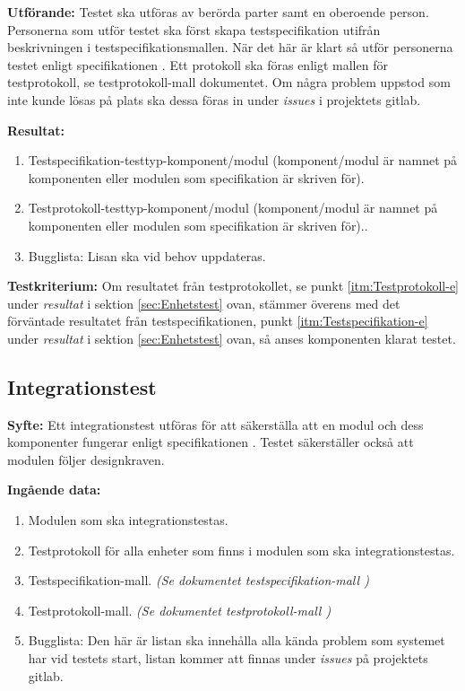 \documentclass[a4paper,10pt]{article}
\begin{document}
    \textbf{Utförande:} Testet ska utföras av berörda parter samt en oberoende person. Personerna som utför testet ska först skapa testspecifikation utifrån beskrivningen i testspecifikationsmallen. När det här är klart så utför personerna testet enligt specifikationen \cite{kravspec}. Ett protokoll ska föras enligt mallen för testprotokoll, se testprotokoll-mall dokumentet. Om några problem uppstod som inte kunde lösas på plats ska dessa föras in under \emph{issues} i projektets gitlab.

    \textbf{Resultat:}
        \begin{enumerate}
            \item \label{itm:Testspecifikation-e} Testspecifikation-testtyp-komponent/modul (komponent/modul är namnet på komponenten eller modulen som specifikation är skriven för).
            \item \label{itm:Testprotokoll-e} Testprotokoll-testtyp-komponent/modul (komponent/modul är namnet på komponenten eller modulen som specifikation är skriven för)..
            \item Bugglista: Lisan ska vid behov uppdateras.
        \end{enumerate}
    \textbf{Testkriterium:} Om resultatet från testprotokollet, se punkt \ref{itm:Testprotokoll-e} under \emph{resultat} i sektion \ref{sec:Enhetstest} ovan, stämmer överens med det förväntade resultatet från testspecifikationen, punkt \ref{itm:Testspecifikation-e} under \emph{resultat} i sektion \ref{sec:Enhetstest} ovan, så anses komponenten klarat testet.

\subsection{Integrationstest}
\label{sec:Integrationstest}
\textbf{Syfte:}
Ett integrationstest utföras för att säkerställa att en modul och dess komponenter fungerar enligt specifikationen \cite{kravspec}. Testet säkerställer också att modulen följer designkraven.

\textbf{Ingående data:}
    \begin{enumerate}
        \item Modulen som ska integrationstestas.
        \item Testprotokoll för alla enheter som finns i modulen som ska integrationstestas.
        \item Testspecifikation-mall. \emph{(Se dokumentet testspecifikation-mall \cite{testspec-mall})}
        \item Testprotokoll-mall. \emph{(Se dokumentet testprotokoll-mall \cite{testprot-mall})}
        \item Bugglista: Den här är listan ska innehålla alla kända problem som systemet har vid testets start, listan kommer att finnas under \emph{issues} på projektets gitlab.
    \end{enumerate}
\end{document}
